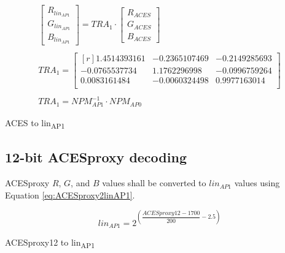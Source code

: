 \begin{floatequ} 
\begin{gather}
    \begin{bmatrix}
        R_{lin_{AP1}}\\
        G_{lin_{AP1}}\\
        B_{lin_{AP1}}
    \end{bmatrix}
    =
    TRA_{1}
    \cdot
    \begin{bmatrix}
        R_{ACES}\\
        G_{ACES}\\
        B_{ACES}
    \end{bmatrix} \\
    \\
    TRA_{1} =
    \begin{bmatrix*}[r]
        1.4514393161 & -0.2365107469 & -0.2149285693 \\
       -0.0765537734 &  1.1762296998 & -0.0996759264 \\
        0.0083161484 & -0.0060324498 &  0.9977163014 \\
    \end{bmatrix*} \\
    \\
    TRA_{1} = NPM^{-1}_{AP1} \cdot NPM_{AP0}
\end{gather}
\caption{ACES to lin\textsubscript{AP1}}
\label{eq:ACES2linAP112}
\end{floatequ}




\subsection{12-bit ACESproxy decoding}
ACESproxy $R$, $G$, and $B$ values shall be converted to $lin_{AP1}$ values using Equation \ref{eq:ACESproxy2linAP1}.

\begin{floatequ} 
\begin{equation} 
    lin_{AP1} = 2^{\left(\dfrac{ACESproxy12-1700}{200}-2.5\right)}
\end{equation}
\caption{ACESproxy12 to lin\textsubscript{AP1}}
\label{eq:ACESproxy2linAP1}
\end{floatequ}

